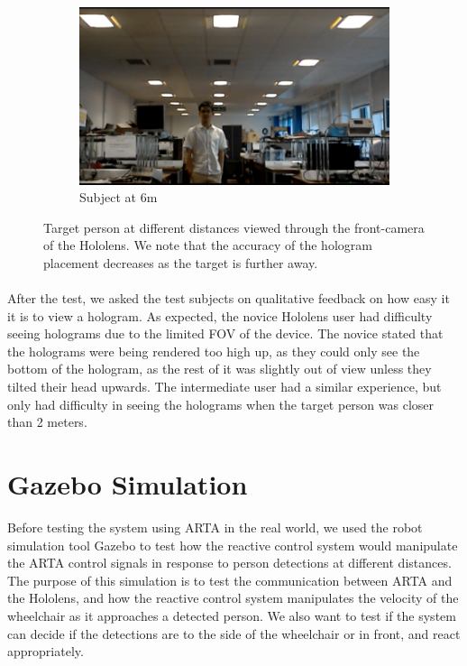 \begin{figure}[ht]
	\begin{subfigure}[b]{.32\textwidth}
		\centering
		\includegraphics[width=1.0\linewidth]{img/chapter6_test/marek2.png}
		\caption{Subject at 6m}
	\end{subfigure}
	\vspace{-1\baselineskip}
	\begin{center}
		\caption{Target person at different distances viewed through the front-camera of the Hololens. We note that the accuracy of the hologram placement decreases as the target is further away.}
		\label{fig:marek}
	\end{center}
	\vspace{-2\baselineskip}
\end{figure}

\paragraph{} After the test, we asked the test subjects on qualitative feedback on how easy it it is to view a hologram. As expected, the novice Hololens user had difficulty seeing holograms due to the limited FOV of the device. The novice stated that the holograms were being rendered too high up, as they could only see the bottom of the hologram, as the rest of it was slightly out of view unless they tilted their head upwards. The intermediate user had a similar experience, but only had difficulty in seeing the holograms when the target person was closer than 2 meters.

\section{Gazebo Simulation}
Before testing the system using ARTA in the real world, we used the robot simulation tool Gazebo to test how the reactive control system would manipulate the ARTA control signals in response to person detections at different distances. The purpose of this simulation is to test the communication between ARTA and the Hololens, and how the reactive control system manipulates the velocity of the wheelchair as it approaches a detected person. We also want to test if the system can decide if the detections are to the side of the wheelchair or in front, and react appropriately. 

